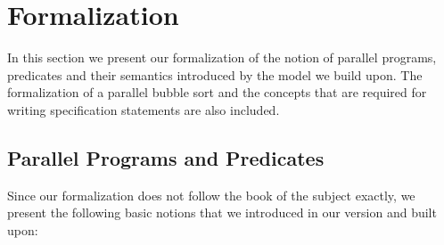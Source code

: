\section{Formalization}

In this section we present our formalization of the notion of parallel programs, predicates and their semantics introduced by the model we build upon. The formalization of a parallel bubble sort and the concepts that are required for writing specification statements are also included.

\subsection{Parallel Programs and Predicates}

Since our formalization does not follow the book of the subject exactly, we present the following basic notions that we introduced in our version and built upon:
